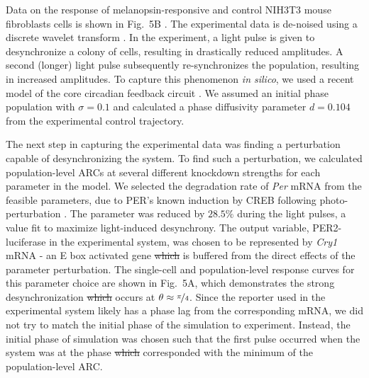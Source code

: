 \documentclass[11pt, letterpaper]{article}
\providecommand{\DIFadd}[1]{{\protect\color{blue}\uwave{#1}}} %
\providecommand{\DIFdel}[1]{{\protect\color{red}\sout{#1}}}                      %
\providecommand{\DIFaddbegin}{} %
\providecommand{\DIFaddend}{} %
\providecommand{\DIFdelbegin}{} %
\providecommand{\DIFdelend}{} %
\begin{document}
Data on the response of melanopsin-responsive and control NIH3T3 mouse
fibroblasts cells is shown in Fig.~5B \cite{Ukai2007}. The experimental data is
de-noised using a discrete wavelet transform \cite{Leise2011}. In the
experiment, a light pulse is given to desynchronize a colony of cells, resulting
in drastically reduced amplitudes. A second (longer) light pulse subsequently
re-synchronizes the population, resulting in increased amplitudes. To capture
this phenomenon {\itshape in silico}, we used a recent model of the core
circadian feedback circuit \cite{Hirota2012}. We assumed an initial phase
population with $\sigma = 0.1$ and calculated a phase diffusivity parameter $d =
0.104$ from the experimental control trajectory. 

The next step in capturing the experimental data was finding a perturbation
capable of desynchronizing the system. To find such a perturbation, we
calculated population-level ARCs at several different knockdown strengths for
each parameter in the model. We selected the degradation rate of {\itshape Per}
mRNA from the feasible parameters, due to PER's known induction by CREB
following photo-perturbation \cite{Tischkau2003}. The parameter was reduced by
$28.5\%$ during the light pulses, a value fit to maximize light-induced
desynchrony. The output variable, PER2-luciferase in the experimental system,
was chosen to be represented by {\itshape Cry1} mRNA - an E box activated gene
\DIFdelbegin \DIFdel{which }\DIFdelend \DIFaddbegin \DIFadd{that }\DIFaddend is buffered from the direct effects of the parameter perturbation. The
single-cell and population-level response curves for this parameter choice are
shown in Fig.~5A, which demonstrates the strong desynchronization \DIFdelbegin \DIFdel{which }\DIFdelend \DIFaddbegin \DIFadd{that }\DIFaddend occurs
at $\theta\approx\nicefrac{\pi}{4}$. Since the reporter used in the experimental
system likely has a phase lag from the corresponding mRNA, we did not try to
match the initial phase of the simulation to experiment. Instead, the initial
phase of simulation was chosen such that the first pulse occurred when the
system was at the phase \DIFdelbegin \DIFdel{which }\DIFdelend \DIFaddbegin \DIFadd{that }\DIFaddend corresponded with the minimum of the
population-level ARC. 
\end{document}

